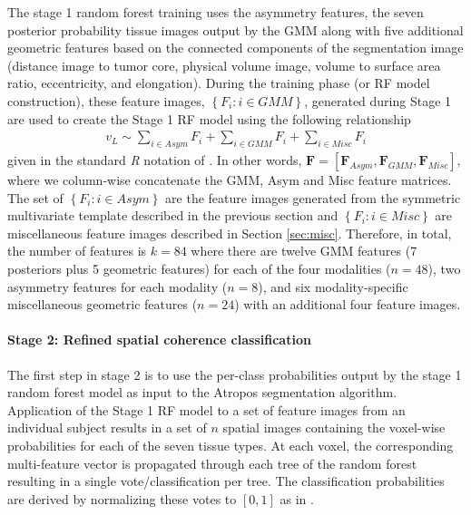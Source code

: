 \documentclass[preprint,authoryear,review,12pt]{elsarticle}
\begin{document}
The stage 1 random forest training uses the asymmetry features, the seven posterior probability
tissue images output by the GMM
along with five additional geometric features based on the connected 
components of the segmentation image (distance image to tumor core,
physical volume image, volume to surface area ratio, eccentricity,
and elongation).
During the training phase (or RF model construction),
these feature images, $\left\{F_i: i \in GMM\right\}$, generated during Stage 1 are used to create
the Stage 1 RF model using the following relationship
\begin{align}
\label{eq:gmm}
 v_L \sim \sum_{i \in Asym} F_i + \sum_{i \in GMM} F_i + \sum_{i \in Misc} F_i
\end{align}
given in the standard \textit{R} notation of \cite{wilkinson1973}.  
In other words, $\bm{F}= [ \bm{F}_{Asym}, \bm{F}_{GMM},
\bm{F}_{Misc} ]$, where we column-wise concatenate the GMM, Asym and
Misc feature matrices.
The set of $\left\{F_i: i \in Asym\right\}$ are the feature images 
generated from the symmetric multivariate template 
described in the previous section and $\left\{F_i: i \in Misc\right\}$
are miscellaneous feature images described in Section \ref{sec:misc}.
Therefore, in total, the number of features is $k=84$ where there
are twelve GMM features (7 posteriors plus 5 geometric features) for each 
of the four modalities ($n=48$), 
two asymmetry features for each modality ($n=8$), and six modality-specific 
miscellaneous geometric features ($n=24$) with an additional four feature
images.


\paragraph{Stage 2:  Refined spatial coherence classification}
The first step in stage 2 is to use the per-class probabilities output
by the stage 1 random forest model as input to the Atropos
segmentation algorithm.  Application of the Stage 1 RF model to a set of feature images 
from an individual subject results in a set of $n$ spatial images
containing the voxel-wise probabilities for each 
of the seven tissue types.  At each voxel, the corresponding multi-feature 
vector is propagated through each tree of the random forest 
resulting in a single vote/classification per tree.  The
classification probabilities are derived by normalizing 
these votes to $[0,1]$ as in \cite{liaw2002}.
 
\end{document}
